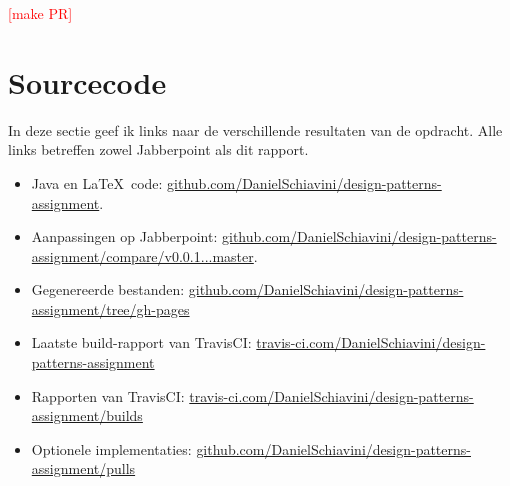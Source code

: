 \documentclass[a4paper]{article}
\newcommand{\todo}[1]{\textcolor{red}{[#1]}\\}
\begin{document}
    \todo{make PR}

\section{Sourcecode}
In deze sectie geef ik links naar de verschillende resultaten van de opdracht.
Alle links betreffen zowel Jabberpoint als dit rapport.
\begin{itemize}
    \item Java en \LaTeX ~code:
        \hyperlink{https://github.com/DanielSchiavini/design-patterns-assignment}{github.com/DanielSchiavini/design-patterns-assignment}.
    \item Aanpassingen op Jabberpoint:
        \hyperlink{https://github.com/DanielSchiavini/design-patterns-assignment/compare/v0.0.1...master}{%
        github.com/DanielSchiavini/design-patterns-assignment/compare/v0.0.1...master}.
    \item Gegenereerde bestanden:
        \hyperlink{https://github.com/DanielSchiavini/design-patterns-assignment/tree/gh-pages}{github.com/DanielSchiavini/design-patterns-assignment/tree/gh-pages}
    \item Laatste build-rapport van TravisCI:
        \hyperlink{https://travis-ci.com/DanielSchiavini/design-patterns-assignment}{travis-ci.com/DanielSchiavini/design-patterns-assignment}
    \item Rapporten van TravisCI:
        \hyperlink{https://travis-ci.com/DanielSchiavini/design-patterns-assignment/builds}{travis-ci.com/DanielSchiavini/design-patterns-assignment/builds}
    \item Optionele implementaties:
        \hyperlink{https://github.com/DanielSchiavini/design-patterns-assignment/pulls}{github.com/DanielSchiavini/design-patterns-assignment/pulls}
\end{itemize}
\end{document}
